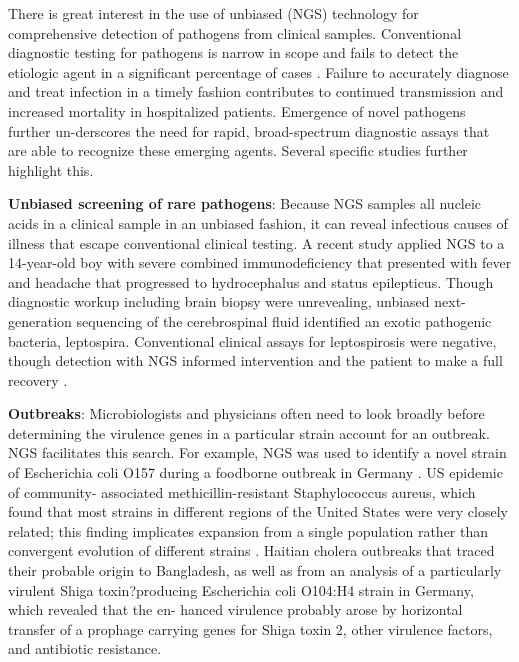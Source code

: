 There is great interest in the use of unbiased (NGS) technology for comprehensive detection of pathogens from clinical samples. Conventional diagnostic testing for pathogens is narrow in scope and fails to detect the etiologic agent in a significant percentage of cases  \cite{Naccache:2014gk,}. Failure to accurately diagnose and treat infection in a timely fashion contributes to continued transmission and increased mortality in hospitalized patients. Emergence of novel pathogens further un-derscores the need for rapid, broad-spectrum diagnostic assays that are able to recognize these emerging agents. Several specific studies further highlight this.

\textbf{Unbiased screening of rare pathogens}: Because NGS samples all nucleic acids in a clinical sample in an unbiased fashion, it can reveal infectious causes of illness that escape conventional clinical testing. A recent study applied NGS to a 14-year-old boy with severe combined immunodeficiency that presented with fever and headache that progressed to hydrocephalus and status epilepticus. Though diagnostic workup including brain biopsy were unrevealing, unbiased next-generation sequencing of the cerebrospinal fluid identified an exotic pathogenic bacteria, leptospira. Conventional clinical assays for leptospirosis were negative, though detection with NGS informed intervention and the patient to make a full recovery  \cite{Wilson:2014dv}. 

\textbf{Outbreaks}: Microbiologists and physicians often need to look broadly before determining the virulence genes in a particular strain account for an outbreak. NGS facilitates this search. For example, NGS was used to identify a novel strain of Escherichia coli O157 during a foodborne outbreak in Germany \cite{Fox:2014fj}. US epidemic of community- associated methicillin-resistant Staphylococcus aureus, which found that most strains in different regions of the United States were very closely related; this finding implicates expansion from a single population rather than convergent evolution of different strains  \cite{Boyd:2013cc}. Haitian cholera outbreaks that traced their probable origin to Bangladesh, as well as from an analysis of a particularly virulent Shiga toxin?producing Escherichia coli O104:H4 strain in Germany, which revealed that the en- hanced virulence probably arose by horizontal transfer of a prophage carrying genes for Shiga toxin 2, other virulence factors, and antibiotic resistance.

